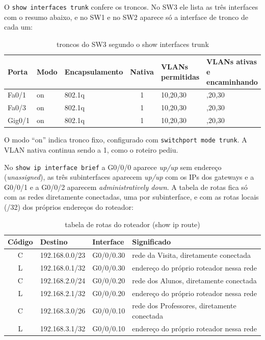 
O \texttt{show interfaces trunk} confere os troncos. No SW3 ele lista as três interfaces com o resumo abaixo, e no SW1 e no SW2 aparece só a interface de tronco de cada um:

\begin{table}[H]
\caption{troncos do SW3 segundo o show interfaces trunk}\label{tab:troncos}
\small\renewcommand{\arraystretch}{1.2}
\begin{tabularx}{\textwidth}{@{}lllcl>{\raggedright\arraybackslash}X@{}}
\toprule
\textbf{Porta} & \textbf{Modo} & \textbf{Encapsulamento} & \textbf{Nativa} & \makecell[l]{\textbf{VLANs}\\\textbf{permitidas}} & \textbf{VLANs ativas e encaminhando}\\
\midrule
Fa0/1 & on & 802.1q & 1 & 10,20,30 & 10,20,30\\
Fa0/3 & on & 802.1q & 1 & 10,20,30 & 10,20,30\\
Gig0/1 & on & 802.1q & 1 & 10,20,30 & 10,20,30\\
\bottomrule
\end{tabularx}
\fonte
\end{table}

O modo ``on'' indica tronco fixo, configurado com \texttt{switchport mode trunk}. A VLAN nativa continua sendo a 1, como o roteiro pediu.


No \texttt{show ip interface brief} a G0/0/0 aparece \emph{up/up} sem endereço (\emph{unassigned}), as três subinterfaces aparecem \emph{up/up} com os IPs dos gateways e a G0/0/1 e a G0/0/2 aparecem \emph{administratively down}. A tabela de rotas fica só com as redes diretamente conectadas, uma por subinterface, e com as rotas locais (/32) dos próprios endereços do roteador:

\begin{table}[H]
\caption{tabela de rotas do roteador (show ip route)}\label{tab:rotas}
\small\renewcommand{\arraystretch}{1.2}
\begin{tabularx}{\textwidth}{@{}cll>{\raggedright\arraybackslash}X@{}}
\toprule
\textbf{Código} & \textbf{Destino} & \textbf{Interface} & \textbf{Significado}\\
\midrule
C & 192.168.0.0/23 & G0/0/0.30 & rede da Visita, diretamente conectada\\
L & 192.168.0.1/32 & G0/0/0.30 & endereço do próprio roteador nessa rede\\
C & 192.168.2.0/24 & G0/0/0.20 & rede dos Alunos, diretamente conectada\\
L & 192.168.2.1/32 & G0/0/0.20 & endereço do próprio roteador nessa rede\\
C & 192.168.3.0/26 & G0/0/0.10 & rede dos Professores, diretamente conectada\\
L & 192.168.3.1/32 & G0/0/0.10 & endereço do próprio roteador nessa rede\\
\bottomrule
\end{tabularx}
\fonte
\end{table}

